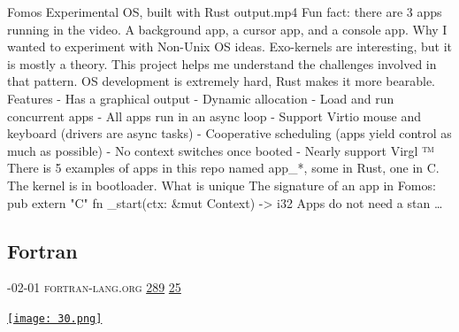 \documentclass[10pt,a4paper]{article}
\begin{document}
\begin{multicols}{2}
Fomos
Experimental OS, built with Rust
output.mp4
Fun fact: there are 3 apps running in the video. A background app, a cursor app, and a console app.
Why
I wanted to experiment with Non-Unix OS ideas.
Exo-kernels are interesting, but it is mostly a theory. This project helps me understand the challenges involved in that pattern.
OS development is extremely hard, Rust makes it more bearable.
Features
- Has a graphical output
- Dynamic allocation
- Load and run concurrent apps
- All apps run in an async loop
- Support Virtio mouse and keyboard (drivers are async tasks)
- Cooperative scheduling (apps yield control as much as possible)
- No context switches once booted
- Nearly support Virgl ™
There is 5 examples of apps in this repo named
app\_*, some in Rust, one in C.
The kernel is in
bootloader.
What is unique
The signature of an app in Fomos:
pub extern "C" fn \_start(ctx: \&mut Context) -> i32
Apps do not need a stan
\dots\par
\noindent\begin{minipage}{\linewidth}
\medskip
\subsection{Fortran}
\textsc{\footnotesize
{\scriptsize\faCalendar}-02-01 
{\scriptsize\faGlobe}\space 
fortran-lang.org 
{\scriptsize\faThumbsOUp}\space 
\href{http://news.ycombinator.com/item?id=37291504\&utm\_term=comment}{289} 
{\scriptsize\faComments}\space 
\href{http://news.ycombinator.com/item?id=37291504\&utm\_term=comment}{25} 
}
\par\medskip\noindent
\href{https://fortran-lang.org/en/index.html?utm\_source=hackernewsletter\&utm\_medium=email\&utm\_term=code}{
    \texttt{[image: 30.png]}
}
\end{minipage}

\end{multicols}
\end{document}
